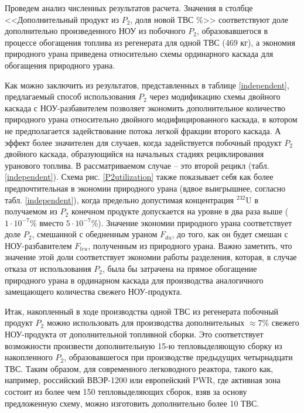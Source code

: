 Проведем анализ численных результатов расчета. Значения в столбце <<Дополнительный продукт из $P_2$, доля новой ТВС \%>> соответствуют доле дополнительно произведенного НОУ из побочного $P_2$, образовавшегося в процессе обогащения топлива из регенерата для одной ТВС (469 кг), а экономия природного урана приведена относительно схемы ординарного каскада для обогащения природного урана.

Как можно заключить из результатов, представленных в таблице \ref{independent}, предлагаемый способ использования $P_2$ через модификацию схемы двойного каскада с НОУ-разбавителем позволяет экономить дополнительное количество природного урана относительно двойного модифицированного каскада, в котором не предполагается задействование потока легкой фракции второго каскада. А эффект более значителен для случаев, когда задействуется побочный продукт $P_2$ двойного каскада, образующийся на начальных стадиях рециклирования уранового топлива. В рассматриваемом случае -- это второй рецикл (табл. \ref{independent}). Схема рис. \ref{P2utilization} также показывает себя как более предпочтительная в экономии природного урана (вдвое выигрышнее, согласно табл. \ref{independent}), когда предельно допустимая концентрация $^{232}$U в получаемом из $P_2$ конечном продукте допускается на уровне в два раза выше ($1\cdot10^{-7}$\% вместо $5\cdot10^{-7}$\%).  Значение экономии природного урана соответствует доле $P_2$, смешанной с обедненным ураном $F_{du}$, до того, как он будет смешан с НОУ-разбавителем $F_{leu}$, полученным из природного урана. Важно заметить, что значение этой доли соответствует экономии работы разделения, которая, в случае отказа от использования $P_2$, была бы затрачена на прямое обогащение природного урана в ординарном каскада для производства аналогичного замещающего количества свежего НОУ-продукта.

Итак, накопленный в ходе производства одной ТВС из регенерата побочный продукт $P_2$ можно использовать для производства дополнительных $\approx$7\% свежего НОУ-продукта от дополнительной топливной сборки. Это соответствует возможности произвести дополнительную 15-ю тепловыделяющую сборку из накопленного $P_2$, образовавшегося при производстве предыдущих четырнадцати ТВС. Таким образом, для современного легководного реактора, такого как, например, российский ВВЭР-1200 или европейский PWR, где активная зона состоит из более чем 150 тепловыделяющих сборок, взяв за основу предложенную схему, можно изготовить дополнительно более 10 ТВС. 



